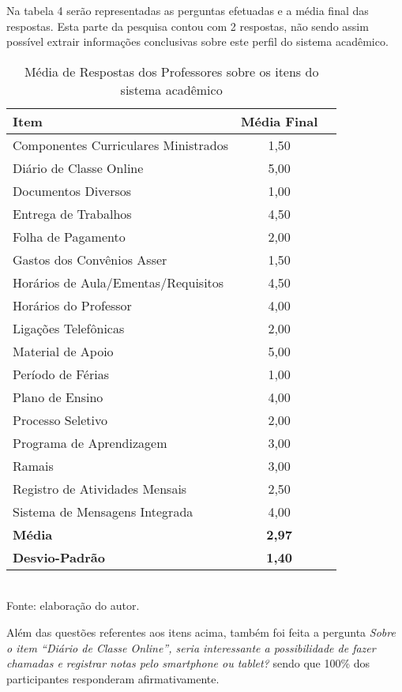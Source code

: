 Na tabela 4 serão representadas as perguntas efetuadas e a média final das respostas. Esta parte da pesquisa contou com 2 respostas, não sendo assim possível extrair informações conclusivas sobre este perfil do sistema acadêmico.

\begin{table}[!hbt]
\centering
\caption[Média de Respostas dos Professores]{Média de Respostas dos Professores sobre os itens do sistema acadêmico}
\vspace{3mm}
\begin{tabular}{|p{9.5cm}|c|c|}\hline
\textbf{Item} & \textbf{Média Final} \\ \hline
Componentes Curriculares Ministrados & 1,50 \\ \hline
Diário de Classe Online & 5,00 \\ \hline
Documentos Diversos & 1,00 \\ \hline
Entrega de Trabalhos & 4,50 \\ \hline
Folha de Pagamento & 2,00 \\ \hline
Gastos dos Convênios Asser & 1,50 \\ \hline
Horários de Aula/Ementas/Requisitos & 4,50 \\ \hline
Horários do Professor & 4,00 \\ \hline
Ligações Telefônicas & 2,00 \\ \hline
Material de Apoio & 5,00 \\ \hline
Período de Férias & 1,00 \\ \hline
Plano de Ensino & 4,00 \\ \hline
Processo Seletivo & 2,00 \\ \hline
Programa de Aprendizagem & 3,00 \\ \hline
Ramais & 3,00 \\ \hline
Registro de Atividades Mensais & 2,50 \\ \hline
Sistema de Mensagens Integrada & 4,00 \\ \hline
\textbf{Média} & \textbf{2,97} \\ \hline
\textbf{Desvio-Padrão} & \textbf{1,40} \\ \hline
\end{tabular}
\\ Fonte: elaboração do autor.
\end{table}

\newpage

Além das questões referentes aos itens acima, também foi feita a pergunta \emph{Sobre o item “Diário de Classe Online'', seria interessante a possibilidade de fazer chamadas e registrar notas pelo smartphone ou tablet?} sendo que 100\% dos participantes responderam afirmativamente.

